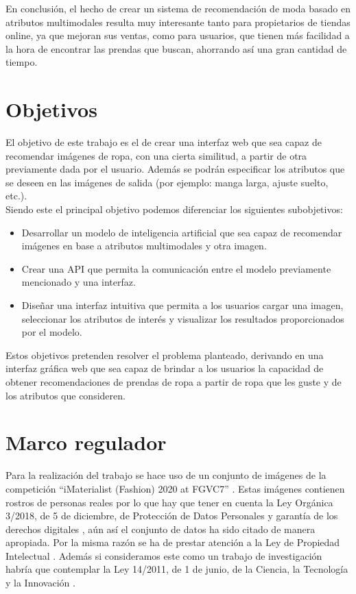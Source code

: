 \documentclass[12pt]{report} %
\begin{document}
	En conclusión, el hecho de crear un sistema de recomendación de moda basado en atributos multimodales
	resulta muy interesante tanto para propietarios de tiendas online, ya que mejoran sus ventas, como para
	usuarios, que tienen más facilidad a la hora de encontrar las prendas que buscan, ahorrando así una
	gran cantidad de tiempo.

	\section{Objetivos}
	El objetivo de este trabajo es el de crear una interfaz web que sea capaz de recomendar imágenes de
	ropa, con una cierta similitud, a partir de otra previamente dada por el usuario. Además se podrán 
	especificar los atributos que se deseen en las imágenes de salida (por ejemplo: manga larga, ajuste suelto, etc.).
	\\
	Siendo este el principal objetivo podemos diferenciar los siguientes subobjetivos:
	\begin{itemize}
		\item Desarrollar un modelo de inteligencia artificial que sea capaz de recomendar imágenes en base a atributos multimodales y otra imagen.
		\item Crear una API que permita la comunicación entre el modelo previamente mencionado y una interfaz.
		\item Diseñar una interfaz intuitiva que permita a los usuarios cargar una imagen, seleccionar los atributos de interés y visualizar los resultados proporcionados por el modelo.
	\end{itemize}

	Estos objetivos pretenden resolver el problema planteado, derivando en una interfaz gráfica web
	que sea capaz de brindar a los usuarios la capacidad de obtener recomendaciones de prendas 
	de ropa a partir de ropa que les guste y de los atributos que consideren. 
	\section{Marco regulador}
	Para la realización del trabajo se hace uso de un conjunto de imágenes de la competición
	``iMaterialist (Fashion) 2020 at FGVC7'' \cite{imaterialist}. Estas imágenes contienen
	rostros de personas reales por lo que  hay que tener en cuenta la Ley Orgánica 3/2018, de 5 de diciembre, 
	de Protección de Datos Personales y garantía de los derechos digitales \cite{ley-proteccion-datos}, aún así el conjunto de datos
	ha sido citado de manera apropiada. Por la misma razón se ha de prestar atención a la Ley de Propiedad Intelectual \cite{ley-propiedad-intelectual}. 
	Además si consideramos este como un trabajo de investigación habría que contemplar la
	Ley 14/2011, de 1 de junio, de la Ciencia, la Tecnología y la Innovación \cite{ley-tecnologia}.
\end{document}
